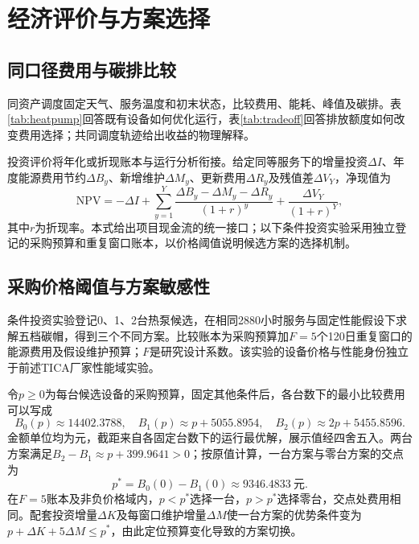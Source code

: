 \section{经济评价与方案选择}
\subsection{同口径费用与碳排比较}

同资产调度固定天气、服务温度和初末状态，比较费用、能耗、峰值及碳排。表\ref{tab:heatpump}回答既有设备如何优化运行，表\ref{tab:tradeoff}回答排放额度如何改变费用选择；共同调度轨迹给出收益的物理解释。

投资评价将年化或折现账本与运行分析衔接。给定同等服务下的增量投资$\Delta I$、年度能源费用节约$\Delta B_y$、新增维护$\Delta M_y$、更新费用$\Delta R_y$及残值差$\Delta V_Y$，净现值为
\begin{equation}
\mathrm{NPV}=-\Delta I+\sum_{y=1}^{Y}\frac{\Delta B_y-\Delta M_y-\Delta R_y}{(1+r)^y}+\frac{\Delta V_Y}{(1+r)^Y},
\label{eq:npv}
\end{equation}
其中$r$为折现率。本式给出项目现金流的统一接口；以下条件投资实验采用独立登记的采购预算和重复窗口账本，以价格阈值说明候选方案的选择机制。

\subsection{采购价格阈值与方案敏感性}

条件投资实验登记0、1、2台热泵候选，在相同2880小时服务与固定性能假设下求解五档碳帽，得到三个不同方案。比较账本为采购预算加$F=5$个120日重复窗口的能源费用及假设维护预算；$F$是研究设计系数。该实验的设备价格与性能身份独立于前述TICA厂家性能域实验。

令$p\geq0$为每台候选设备的采购预算，固定其他条件后，各台数下的最小比较费用可以写成
\begin{equation}
B_0(p)\approx14402.3788,\quad
B_1(p)\approx p+5055.8954,\quad
B_2(p)\approx2p+5455.8596.
\label{eq:price-lines}
\end{equation}
金额单位均为元，截距来自各固定台数下的运行最优解，展示值经四舍五入。两台方案满足$B_2-B_1\approx p+399.9641>0$；按原值计算，一台方案与零台方案的交点为
\begin{equation}
p^*=B_0(0)-B_1(0)\approx9346.4833\ \text{元}.
\label{eq:price-threshold}
\end{equation}
在$F=5$账本及非负价格域内，$p<p^*$选择一台，$p>p^*$选择零台，交点处费用相同。配套投资增量$\Delta K$及每窗口维护增量$\Delta M$使一台方案的优势条件变为\mbox{$p+\Delta K+5\Delta M\leq p^*$}，由此定位预算变化导致的方案切换。
